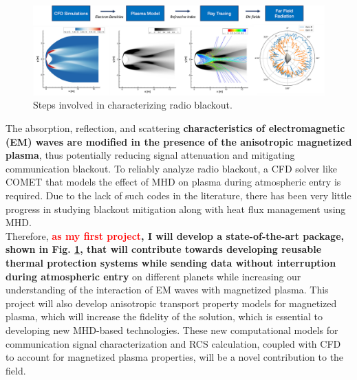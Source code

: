 \documentclass[11pt,sans]{wlscirep} %
\begin{document}
\vspace{-5pt}
\begin{figure}[H]
   \centering
         \includegraphics[trim={1cm .1cm 0.11cm 0.1cm},clip,scale=0.5]{figures/algo.png}
        \caption{Steps involved in characterizing radio blackout.\cite{sharma2024mhd, giangaspero20233d, giangaspero2024raytracing}}\vspace{-15pt}
        \label{fig:blackout_algo}
\end{figure}%
\noindent The absorption, reflection, and scattering \textbf{characteristics of electromagnetic (EM) waves are modified in the presence of the anisotropic magnetized plasma}, thus potentially reducing signal attenuation and mitigating communication blackout. To reliably analyze radio blackout, a CFD solver like COMET that models the effect of MHD on plasma during atmospheric entry is required. Due to the lack of such codes in the literature, there has been very little progress in studying blackout mitigation along with heat flux management using MHD.\\ 
Therefore, \textbf{\textcolor{red}{as my first project}, I will develop a state-of-the-art package, shown in Fig. \ref{fig:blackout_algo}, that will contribute towards developing reusable thermal protection systems while sending data without interruption during atmospheric entry} on different planets while increasing our understanding of the interaction of EM waves with magnetized plasma. This project will also develop anisotropic transport property models for magnetized plasma, which will increase the fidelity of the solution, which is essential to developing new MHD-based technologies. 
These new computational models for communication signal characterization and RCS calculation, coupled with CFD to account for magnetized plasma properties, will be a novel contribution to the field. 
\end{document}
